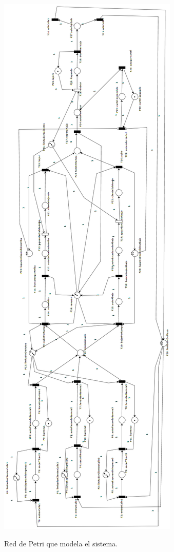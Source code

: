 \documentclass[12pt,a4paper]{article}
\begin{document}
\begin{figure}[H]
    \centering
    \includegraphics[scale=0.4]{estacionamiento_2019}
    \label{fig:rdp}
    \caption{Red de Petri que modela el sistema.}
\end{figure}
\end{document}
